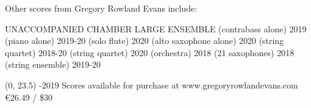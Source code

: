 \documentclass[10pt]{article}
\begin{document}

\begin{center}
\fontsize{.6cm}{1em}\selectfont Other scores from Gregory Rowland Evans include: \hfill
\end{center}
\vspace*{4\baselineskip}
{
\begin{center}
\setlength{\columnseprule}{1pt}
\setlength{\columnsep}{6em}

\begin{paracol}{3}
\fontsize{.5cm}{1em}\selectfont UNACCOMPANIED
\switchcolumn[1]
\fontsize{.5cm}{1em}\selectfont CHAMBER
\switchcolumn[2]
\fontsize{.5cm}{1em}\selectfont LARGE ENSEMBLE
\switchcolumn[0]
\fontsize{.1cm}{0.5em}  (contrabass alone) 2019
\switchcolumn[0]
\fontsize{.1cm}{0.5em}  (piano alone) 2019-20
\switchcolumn[0]
\fontsize{.1cm}{0.5em}  (solo flute) 2020
\switchcolumn[0]
\fontsize{.1cm}{0.5em}  (alto saxophone alone) 2020
\switchcolumn[1]
\fontsize{.1cm}{0.5em}  (string quartet) 2018-20
\switchcolumn[1]
\fontsize{.1cm}{0.5em}  (string quartet) 2020
\switchcolumn[2]
\fontsize{.1cm}{0.5em}  (orchestra) 2018
\switchcolumn[2]
\fontsize{.1cm}{0.5em}  (21 saxophones) 2018
\switchcolumn[2]
\fontsize{.1cm}{0.5em}  (string ensemble) 2019-20


\end{paracol}
\end{center}
}

\begin{textblock}{23}(0, 23.5)
-2019 \hfill
Scores available for purchase at www.gregoryrowlandevans.com \hfill
\euro 26.49 / \$30
\end{textblock}
\end{document}
